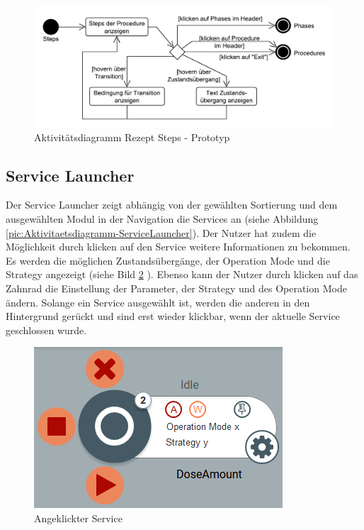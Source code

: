 \begin{figure}[htbp]
\centering
\includegraphics[scale=0.6]{DA_files/UML/Prototyp/Aktivitaetsdiagramm-Rezept-Steps.pdf}
\caption{Aktivitätsdiagramm Rezept Steps - Prototyp}
\label{pic:Aktivitaetsdiagramm-Rezept-Steps}
\end{figure}

\subsection{Service Launcher}
Der Service Launcher zeigt abhängig von der gewählten Sortierung und dem ausgewählten Modul in der Navigation die Services an (siehe Abbildung \ref{pic:Aktivitaetsdiagramm-ServiceLauncher}). Der Nutzer hat zudem die Möglichkeit durch klicken auf den Service weitere Informationen zu bekommen. Es werden die möglichen Zustandsübergänge, der Operation Mode und die Strategy angezeigt (siehe Bild \ref{pic:Service-offen} ). Ebenso kann der Nutzer durch klicken auf das Zahnrad die Einstellung der Parameter, der Strategy und des Operation Mode ändern. Solange ein Service ausgewählt ist, werden die anderen in den Hintergrund gerückt und sind erst wieder klickbar, wenn der aktuelle Service geschlossen wurde.
\begin{figure}[htbp]
\centering
\includegraphics[scale=0.7]{DA_files/Bilder/Prototyp/Service-offen.png}
\caption{Angeklickter  Service}
\label{pic:Service-offen}
\end{figure}

